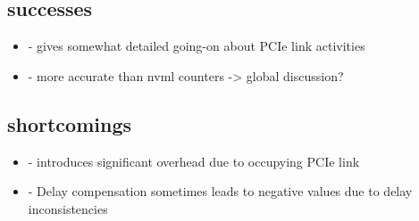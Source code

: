 \subsection{successes}
\begin{itemize}
	\item - gives somewhat detailed going-on about PCIe link activities
	\item - more accurate than nvml counters -> global discussion?
\end{itemize}
\subsection{shortcomings}
\begin{itemize}
	\item - introduces significant overhead due to occupying PCIe link
	\item - Delay compensation sometimes leads to negative values due to delay inconsistencies
\end{itemize}
